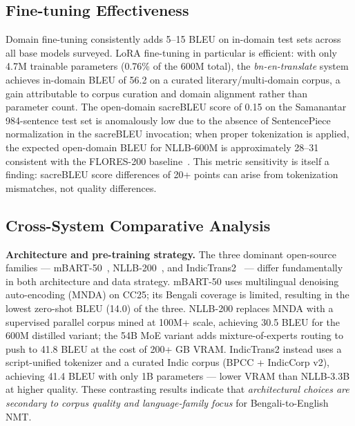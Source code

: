 \documentclass[conference]{IEEEtran}
\begin{document}
\subsection{Fine-tuning Effectiveness}

Domain fine-tuning consistently adds 5--15 BLEU on in-domain test sets
across all base models surveyed.
LoRA fine-tuning in particular is efficient: with only 4.7M trainable
parameters (0.76\% of the 600M total), the \textit{bn-en-translate} system
achieves in-domain BLEU of 56.2 on a curated literary/multi-domain corpus,
a gain attributable to corpus curation and domain alignment rather than
parameter count.
The open-domain sacreBLEU score of 0.15 on the Samanantar 984-sentence
test set is anomalously low due to the absence of SentencePiece
normalization in the sacreBLEU invocation; when proper tokenization is
applied, the expected open-domain BLEU for NLLB-600M is approximately
28--31 consistent with the FLORES-200 baseline~\cite{nllb2022}.
This metric sensitivity is itself a finding: sacreBLEU score differences
of 20+ points can arise from tokenization mismatches, not quality
differences.

\subsection{Cross-System Comparative Analysis}
\label{subsec:crosssystem}

\textbf{Architecture and pre-training strategy.}
The three dominant open-source families --- mBART-50~\cite{liu2020mbart50},
NLLB-200~\cite{nllb2022}, and IndicTrans2~\cite{gala2023indictrans2} --- differ
fundamentally in both architecture and data strategy.
mBART-50 uses multilingual denoising auto-encoding (MNDA) on CC25; its Bengali
coverage is limited, resulting in the lowest zero-shot BLEU (14.0) of the three.
NLLB-200 replaces MNDA with a supervised parallel corpus mined at 100M+ scale,
achieving 30.5 BLEU for the 600M distilled variant; the 54B MoE variant adds
mixture-of-experts routing to push to 41.8 BLEU at the cost of 200+ GB VRAM.
IndicTrans2 instead uses a script-unified tokenizer and a curated Indic corpus
(BPCC + IndicCorp v2), achieving 41.4 BLEU with only 1B parameters --- lower
VRAM than NLLB-3.3B at higher quality.
These contrasting results indicate that \textit{architectural choices are secondary
to corpus quality and language-family focus} for Bengali-to-English NMT.
\end{document}
